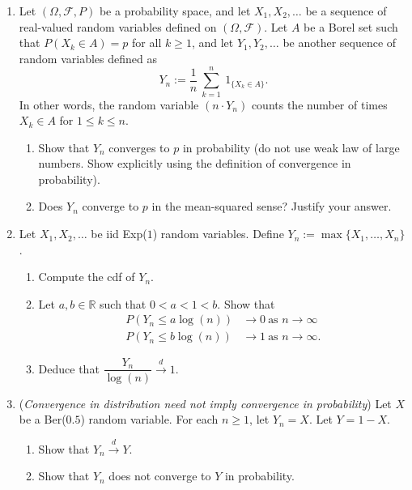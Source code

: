 \documentclass[10pt]{article}
\begin{document}
\begin{enumerate}
\item Let $(\Omega,\mathcal{F},P)$ be a probability space, and let $X_{1}, X_{2},\ldots$ be a sequence of real-valued random variables defined on $(\Omega,\mathcal{F})$. Let $A$ be a Borel set such that $P(X_{k}\in A)=p$ for all $k\geq 1$, and let $Y_{1},Y_{2},\ldots$ be another sequence of random variables defined as
\begin{equation*}
Y_{n}:=\frac{1}{n}~\sum\limits_{k=1}^{n}~1_{\{X_{k}\in A\}}.
\end{equation*} 
In other words, the random variable $(n\cdot Y_{n})$ counts the number of times $X_{k}\in A$ for $1\leq k\leq n$.
\begin{enumerate}
	\item Show that $Y_{n}$ converges to $p$ in probability (do not use weak law of large numbers. Show explicitly using the definition of convergence in probability).
	\item Does $Y_{n}$ converge to $p$ in the mean-squared sense? Justify your answer.
\end{enumerate}

\item Let $X_{1},X_{2},\ldots$ be iid Exp($1$) random variables. Define $Y_{n}:=\max\{X_{1},\ldots,X_{n}\}$.
\begin{enumerate}
	\item Compute the cdf of $Y_{n}$.
	\item Let $a,b\in \mathbb{R}$ such that $0<a<1<b$. Show that
	\begin{align*}
	P(Y_{n}\leq a\log(n)) &\longrightarrow 0~\text{as }n\to \infty\\
	P(Y_{n}\leq b\log(n)) &\longrightarrow 1~\text{as }n\to \infty.
	\end{align*}
	\item Deduce that $\dfrac{Y_{n}}{\log(n)}\stackrel{d}{\longrightarrow}1$.
\end{enumerate} 

\item (\emph{Convergence in distribution need not imply convergence in probability}) Let $X$ be a Ber($0.5$) random variable. For each $n\geq 1$, let $Y_{n}=X$. Let $Y=1-X$.
\begin{enumerate}
	\item Show that $Y_{n}\stackrel{d}{\longrightarrow}Y$.
	\item Show that $Y_{n}$ does not converge to $Y$ in probability.
\end{enumerate}
\end{enumerate}
\end{document}
